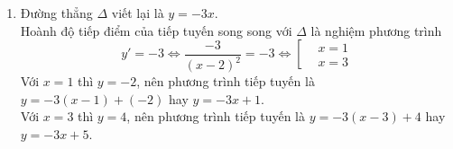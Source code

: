 \begin{vd}
{\begin{enumerate}
\begin{itemize}
\begin{center}
				\end{center}
			\end{itemize}
			\item Đường thẳng $\Delta$ viết lại là $y=-3x$.\\
			Hoành độ tiếp điểm của tiếp tuyến song song với $\Delta$ là nghiệm phương trình
			$$y'=-3\Leftrightarrow \dfrac{-3}{\left(x-2\right)^2}=-3 \Leftrightarrow \left[\begin{aligned}
			&x=1\\
			&x=3
			\end{aligned}\right.$$
			Với $x=1$ thì $y=-2$, nên phương trình tiếp tuyến là $y=-3(x-1)+(-2)$ hay $y=-3x+1$.\\
			Với $x=3$ thì $y=4$, nên phương trình tiếp tuyến là $y=-3(x-3)+4$ hay $y=-3x+5$.\\
		\end{enumerate}
	}
\end{vd}


